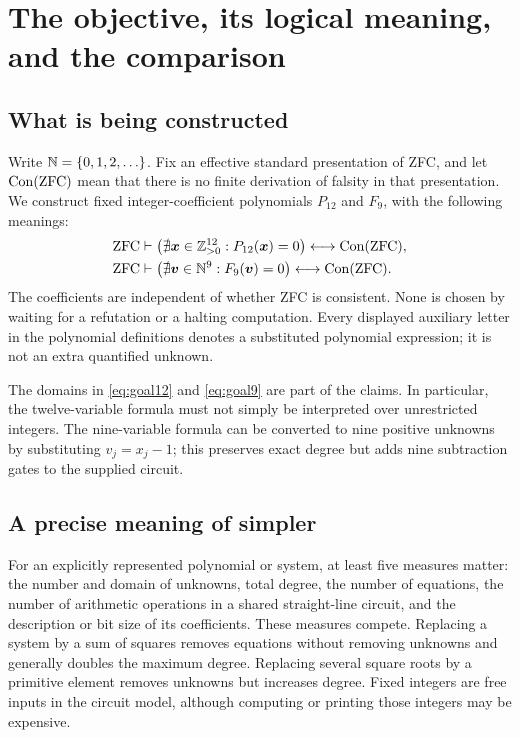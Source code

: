 \section{The objective, its logical meaning, and the comparison}

\subsection{What is being constructed}
Write $\mathbb N=\{0,1,2,\ldots\}$. Fix an effective standard presentation of ZFC,
and let $\operatorname{Con}(\mathrm{ZFC})$ mean that there is no finite derivation of falsity in
that presentation. We construct fixed integer-coefficient polynomials
$P_{12}$ and $F_9$, with the following meanings:
\begin{align}
 \mathrm{ZFC}&\vdash
 \bigl(\nexists\boldsymbol{x}\in\mathbb Z_{>0}^{12}:P_{12}(\boldsymbol{x})=0\bigr)
 \longleftrightarrow\operatorname{Con}(\mathrm{ZFC}),\label{eq:goal12}\\
 \mathrm{ZFC}&\vdash
 \bigl(\nexists\boldsymbol{v}\in\mathbb N^9:F_9(\boldsymbol{v})=0\bigr)
 \longleftrightarrow\operatorname{Con}(\mathrm{ZFC}).\label{eq:goal9}
\end{align}
The coefficients are independent of whether ZFC is consistent. None is
chosen by waiting for a refutation or a halting computation. Every displayed
auxiliary letter in the polynomial definitions denotes a substituted
polynomial expression; it is not an extra quantified unknown.

The domains in \eqref{eq:goal12} and \eqref{eq:goal9} are part of the claims.
In particular, the twelve-variable formula must not simply be interpreted
over unrestricted integers. The nine-variable formula can be converted to
nine positive unknowns by substituting $v_j=x_j-1$; this preserves exact
degree but adds nine subtraction gates to the supplied circuit.

\subsection{A precise meaning of simpler}
For an explicitly represented polynomial or system, at least five measures
matter: the number and domain of unknowns, total degree, the number of
equations, the number of arithmetic operations in a shared straight-line
circuit, and the description or bit size of its coefficients. These measures
compete. Replacing a system by a sum of squares removes equations without
removing unknowns and generally doubles the maximum degree. Replacing
several square roots by a primitive element removes unknowns but increases
degree. Fixed integers are free inputs in the circuit model, although
computing or printing those integers may be expensive.

